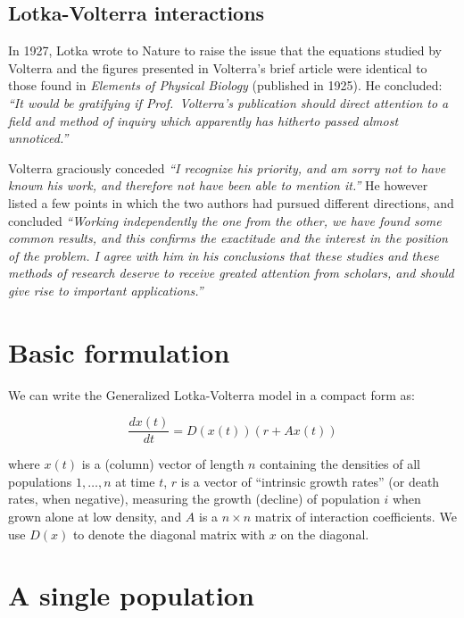 \documentclass[]{book}
\begin{document}
\hypertarget{lotka-volterra-interactions}{%
\subsection{Lotka-Volterra interactions}\label{lotka-volterra-interactions}}

In 1927, Lotka wrote to Nature to raise the issue that the equations studied by Volterra and the figures presented in Volterra's brief article were identical to those found in \emph{Elements of Physical Biology} (published in 1925). He concluded: \emph{``It would be gratifying if Prof.~Volterra's publication should direct attention to a field and method of inquiry which apparently has hitherto passed almost unnoticed.''}

Volterra graciously conceded \emph{``I recognize his priority, and am sorry not to have known his work, and therefore not have been able to mention it.''} He however listed a few points in which the two authors had pursued different directions, and concluded \emph{``Working independently the one from the other, we have found some common results, and this confirms the exactitude and the interest in the position of the problem. I agree with him in his conclusions that these studies and these methods of research deserve to receive greated attention from scholars, and should give rise to important applications.''}

\hypertarget{basic-formulation}{%
\section{Basic formulation}\label{basic-formulation}}

We can write the Generalized Lotka-Volterra model in a compact form as:

\[
\dfrac{dx(t)}{dt} = D(x(t))(r + A x(t))
\]

where \(x(t)\) is a (column) vector of length \(n\) containing the densities of all populations \(1, \ldots, n\) at time \(t\), \(r\) is a vector of ``intrinsic growth rates'' (or death rates, when negative), measuring the growth (decline) of population \(i\) when grown alone at low density, and \(A\) is a \(n \times n\) matrix of interaction coefficients. We use \(D(x)\) to denote the diagonal matrix with \(x\) on the diagonal.

\hypertarget{a-single-population}{%
\section{A single population}\label{a-single-population}}
\end{document}
